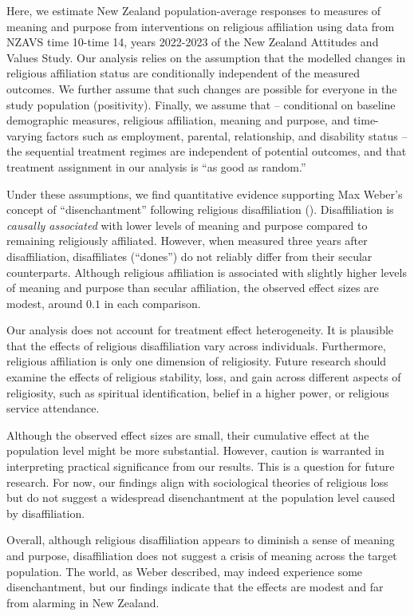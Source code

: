 \documentclass[
  single column]{article}
\begin{document}
Here, we estimate New Zealand population-average responses to measures
of meaning and purpose from interventions on religious affiliation using
data from NZAVS time 10-time 14, years 2022-2023 of the New Zealand
Attitudes and Values Study. Our analysis relies on the assumption that
the modelled changes in religious affiliation status are conditionally
independent of the measured outcomes. We further assume that such
changes are possible for everyone in the study population (positivity).
Finally, we assume that -- conditional on baseline demographic measures,
religious affiliation, meaning and purpose, and time-varying factors
such as employment, parental, relationship, and disability status -- the
sequential treatment regimes are independent of potential outcomes, and
that treatment assignment in our analysis is ``as good as random.''

Under these assumptions, we find quantitative evidence supporting Max
Weber's concept of ``disenchantment'' following religious disaffiliation
(). Disaffiliation is
\emph{causally associated} with lower levels of meaning and purpose
compared to remaining religiously affiliated. However, when measured
three years after disaffiliation, disaffiliates (``dones'') do not
reliably differ from their secular counterparts. Although religious
affiliation is associated with slightly higher levels of meaning and
purpose than secular affiliation, the observed effect sizes are modest,
around \(0.1\) in each comparison.

Our analysis does not account for treatment effect heterogeneity. It is
plausible that the effects of religious disaffiliation vary across
individuals. Furthermore, religious affiliation is only one dimension of
religiosity. Future research should examine the effects of religious
stability, loss, and gain across different aspects of religiosity, such
as spiritual identification, belief in a higher power, or religious
service attendance.

Although the observed effect sizes are small, their cumulative effect at
the population level might be more substantial. However, caution is
warranted in interpreting practical significance from our results. This
is a question for future research. For now, our findings align with
sociological theories of religious loss but do not suggest a widespread
disenchantment at the population level caused by disaffiliation.

Overall, although religious disaffiliation appears to diminish a sense
of meaning and purpose, disaffiliation does not suggest a crisis of
meaning across the target population. The world, as Weber described, may
indeed experience some disenchantment, but our findings indicate that
the effects are modest and far from alarming in New Zealand.
\end{document}
